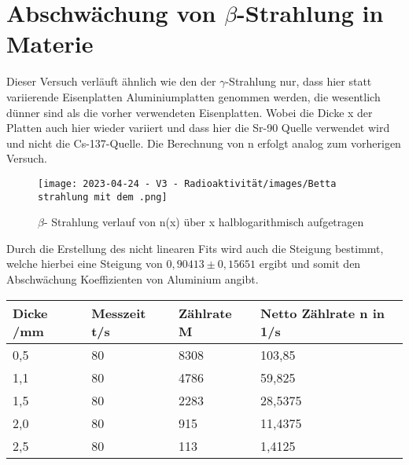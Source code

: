 \documentclass[../protokoll.tex]{subfiles}
\begin{document}
\section{Abschwächung von \texorpdfstring{$\beta$}{Beta}-Strahlung in Materie}\label{sec:Abschwächung Beta-Strahlung}
Dieser Versuch verläuft ähnlich wie den der $\gamma$-Strahlung nur, dass hier statt variierende Eisenplatten Aluminiumplatten genommen werden, die wesentlich dünner sind als die vorher verwendeten Eisenplatten. Wobei die Dicke x der Platten auch hier wieder variiert und dass hier die Sr-90 Quelle verwendet wird und nicht die Cs-137-Quelle. Die Berechnung von n erfolgt analog zum vorherigen Versuch.   
\begin{figure}[H]
    \centering
    \texttt{[image: 2023-04-24 - V3 - Radioaktivität/images/Betta strahlung mit dem .png]}
    \caption{$\beta$- Strahlung verlauf von n(x) über x halblogarithmisch aufgetragen}
    \label{Abb.2}
\end{figure}
Durch die Erstellung des nicht linearen Fits wird auch die Steigung bestimmt, welche hierbei eine Steigung von $0,90413 \pm 0,15651$ ergibt und somit den Abschwächung Koeffizienten von Aluminium angibt.
\begin{table}[H]
\centering
\begin{tabular}{|l|l|l|l|}
\hline
Dicke /mm & Messzeit  t/s & Zählrate  M & Netto Zählrate n in 1/s \\ \hline
0,5       & 80            & 8308        & 103,85                  \\ \hline
1,1       & 80            & 4786        & 59,825                  \\ \hline
1,5       & 80            & 2283        & 28,5375                 \\ \hline
2,0       & 80            & 915         & 11,4375                 \\ \hline
2,5       & 80            & 113         & 1,4125                  \\ \hline
\end{tabular}
\end{table}
\end{document}
